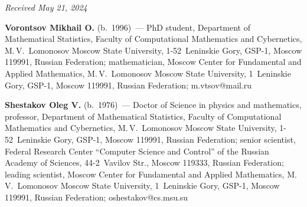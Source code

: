\vspace*{-6pt}

\hfill{\small\textit{Received May 21, 2024}} 


\Contr

\vspace*{-3pt}


\noindent
\textbf{Vorontsov Mikhail O.} (b.\ 1996)~--- PhD student, Department of Mathematical Statistics, 
Faculty of Computational Mathematics and Cybernetics, M.\,V.~Lomonosov Moscow State University, 1-52~Leninskie Gory, GSP-1, Moscow 119991, Russian Federation;  
mathematician, Moscow Center for Fundamental and Applied Mathematics, M.\,V.~Lomonosov Moscow State University, 1~Leninskie Gory, GSP-1, Moscow 119991, Russian Federation;
\mbox{m.vtsov@mail.ru}

\vspace*{6pt}

\noindent
\textbf{Shestakov Oleg V.} (b.\ 1976)~--- Doctor of Science in physics and mathematics, professor, Department of Mathematical Statistics,
 Faculty of Computational Mathematics and Cybernetics, M.\,V.~Lomonosov Moscow State University, 1-52~Leninskie Gory, GSP-1, Moscow 119991, Russian Federation; 
 senior scientist, Federal Research Center ``Computer Science and Control'' of the Russian Academy of Sciences, 44-2~Vavilov Str., Moscow 119333, 
 Russian Federation; leading scientist, Moscow Center for Fundamental and Applied Mathematics, M.\,V.~Lomonosov Moscow State University, 
 1~Leninskie Gory, GSP-1, Moscow 119991, Russian Federation; \mbox{oshestakov@cs.msu.su}


\label{end\stat}

\renewcommand{\bibname}{\protect\rm Литература} 